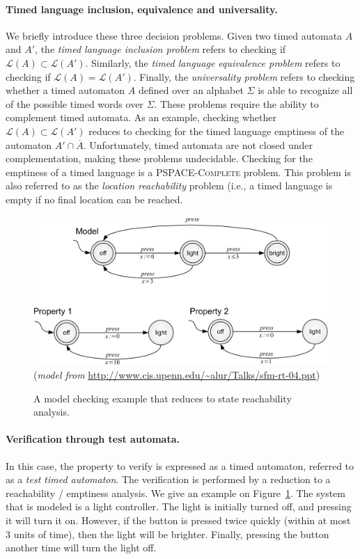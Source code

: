 \paragraph{Timed language inclusion, equivalence and universality.}
We briefly introduce these three decision problems.
%
Given two timed automata $A$ and $A'$, the \emph{timed language inclusion problem} refers to checking if $\mathcal{L}(A) \subset \mathcal{L}(A')$. Similarly, the \emph{timed language equivalence problem} refers to checking if $\mathcal{L}(A) = \mathcal{L}(A')$. Finally, the \emph{universality problem} refers to checking whether a timed automaton $A$ defined over an alphabet $\Sigma$ is able to recognize all of the possible timed words over $\Sigma$.
%
These problems require the ability to complement timed automata. As an example, checking whether $\mathcal{L}(A) \subset \mathcal{L}(A')$ reduces to checking for the timed language emptiness of the automaton $A' \cap \overline{A}$. Unfortunately, timed automata are not closed under complementation, making these problems undecidable.
%
Checking for the emptiness of a timed language is a \textsc{PSPACE-Complete} problem. This problem is also referred to as the \emph{location reachability} problem (i.e., a timed language is empty if no final location can be reached.

\begin{figure}[htbp]
    \includegraphics[width=\textwidth]{content/timed-automata/light-verification-inclusion}
    (\textit{model from} \url{http://www.cis.upenn.edu/~alur/Talks/sfm-rt-04.ppt})
    \caption{A model checking example that reduces to state reachability analysis.}
    \label{fig:light-verification-inclusion}
\end{figure}

\paragraph{Verification through test automata.}
In this case, the property to verify is expressed as a timed automaton, referred to as a \emph{test timed automaton}. The verification is performed by a reduction to a reachability / emptiness analysis. We give an example on Figure~\ref{fig:light-verification-inclusion}. The system that is modeled is a light controller. The light is initially turned off, and pressing it will turn it on. However, if the button is pressed twice quickly (within at most 3 units of time), then the light will be brighter. Finally, pressing the button another time will turn the light off.

